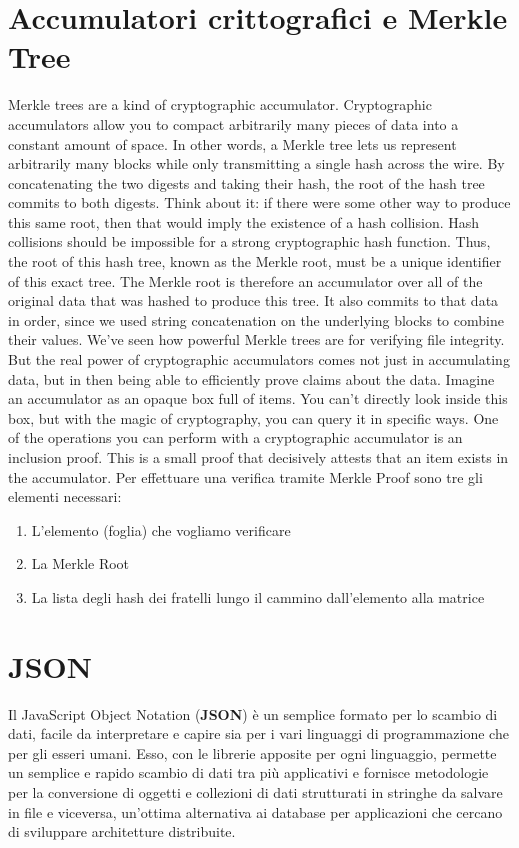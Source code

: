 \section{Accumulatori crittografici e Merkle Tree}
\label{sub:mt}
Merkle trees are a kind of cryptographic accumulator. Cryptographic accumulators allow you to compact arbitrarily many pieces of data into a constant amount of space. In other words, a Merkle tree lets us represent arbitrarily many blocks while only transmitting a single hash across the wire.
By concatenating the two digests and taking their hash, the root of the hash tree commits to both digests. Think about it: if there were some other way to produce this same root, then that would imply the existence of a hash collision. Hash collisions should be impossible for a strong cryptographic hash function. Thus, the root of this hash tree, known as the Merkle root, must be a unique identifier of this exact tree.
The Merkle root is therefore an accumulator over all of the original data that was hashed to produce this tree. It also commits to that data in order, since we used string concatenation on the underlying blocks to combine their values.
We've seen how powerful Merkle trees are for verifying file integrity. But the real power of cryptographic accumulators comes not just in accumulating data, but in then being able to efficiently prove claims about the data.
Imagine an accumulator as an opaque box full of items. You can't directly look inside this box, but with the magic of cryptography, you can query it in specific ways.
One of the operations you can perform with a cryptographic accumulator is an inclusion proof. This is a small proof that decisively attests that an item exists in the accumulator.
Per effettuare una verifica tramite Merkle Proof sono tre gli elementi necessari:
\begin{enumerate}
    \item L’elemento (foglia) che vogliamo verificare
    \item La Merkle Root
    \item La lista degli hash dei fratelli lungo il cammino dall’elemento alla matrice
\end{enumerate}

\section{JSON}
\label{sub:json}
Il JavaScript Object Notation (\textbf{JSON}) è un semplice formato per lo scambio di dati,
facile da interpretare e capire sia per i vari linguaggi di programmazione che per gli esseri umani.
Esso, con le librerie apposite per ogni linguaggio, permette un semplice e rapido scambio
di dati tra più applicativi e fornisce metodologie per la conversione di oggetti e collezioni
di dati strutturati in stringhe da salvare in file e viceversa, un’ottima alternativa ai database
per applicazioni che cercano di sviluppare architetture distribuite.

